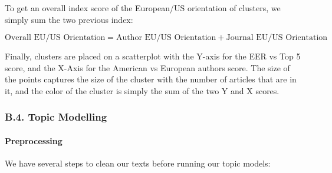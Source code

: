 \documentclass[]{elsarticle} %
\begin{document}
To get an overall index score of the European/US orientation of
clusters, we simply sum the two previous index:

\({\scriptstyle \text{Overall EU/US Orientation}=\text{Author EU/US Orientation} + \text{Journal EU/US Orientation}}\)

Finally, clusters are placed on a scatterplot with the Y-axis for the
EER vs Top 5 score, and the X-Axis for the American vs European authors
score. The size of the points captures the size of the cluster with the
number of articles that are in it, and the color of the cluster is
simply the sum of the two Y and X scores.

\hypertarget{topic}{%
\subsubsection*{B.4. Topic Modelling}\label{topic}}

\hypertarget{preprocessing}{%
\paragraph*{Preprocessing}\label{preprocessing}}

We have several steps to clean our texts before running our topic
models:
\end{document}
